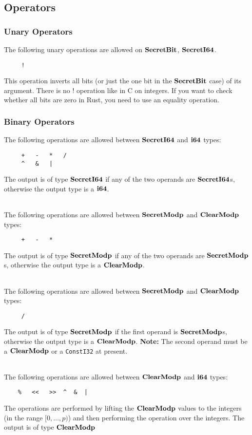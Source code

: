 \subsection{Operators}

\subsubsection{Unary Operators}
The following unary operations are allowed on $\mathbf{SecretBit}$, $\mathbf{SecretI64}$.
\begin{verbatim}
     !
\end{verbatim}
This operation inverts all bits (or just the one bit in the $\mathbf{SecretBit}$ case)
of its argument. There is no $!$ operation like in C on integers. If you want to
check whether all bits are zero in Rust, you need to use an equality operation.


\subsubsection{Binary Operators}
The following operations are allowed between $\mathbf{SecretI64}$ and $\mathbf{i64}$
types:
\begin{verbatim}
     +   -   *   /
     ^   &   |
\end{verbatim}
The output is of type $\mathbf{SecretI64}$ if any of the two operands are
$\mathbf{SecretI64}$s, otherwise the output type is a $\mathbf{i64}$.

~\\

\noindent
The following operations are allowed between $\mathbf{SecretModp}$ and $\mathbf{ClearModp}$
types:
\begin{verbatim}
     +   -   *
\end{verbatim}
The output is of type $\mathbf{SecretModp}$ if any of the two operands are
$\mathbf{SecretModp}$s, otherwise the output type is a $\mathbf{ClearModp}$.

~\\
\noindent
The following operations are allowed between $\mathbf{SecretModp}$ and $\mathbf{ClearModp}$
types:
\begin{verbatim}
     /
\end{verbatim}
The output is of type $\mathbf{SecretModp}$ if the first operand is
$\mathbf{SecretModp}$s, otherwise the output type is a $\mathbf{ClearModp}$.
     {\bf Note:} The second operand must be a $\mathbf{ClearModp}$ or a \verb|ConstI32| at present.

~ \\

\noindent
The following operations are allowed between $\mathbf{ClearModp}$ and $\mathbf{i64}$ types:
\begin{verbatim}
    %   <<   >>  ^  &  |
\end{verbatim}
The operations are performed by lifting the $\mathbf{ClearModp}$ values to
the integers (in the range $[0,\ldots,p)$) and then performing
the operation over the integers.  The output is of type $\mathbf{ClearModp}$

